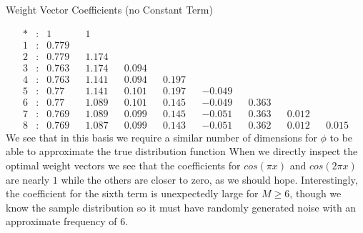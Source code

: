 \documentclass[1pt]{article}
\begin{document}
\begin{enumerate}[label=\alph*.)]
\centerline{Weight Vector Coefficients (no Constant Term)}
\begin{align*}
* & : & 1 & & 1 & &  \\
1 & : & 0.779 & &   & & \\
2 & : & 0.779 & & 1.174 & &  \\
3 & : & 0.763 & & 1.174 & & 0.094 \\
4 & : & 0.763 & & 1.141 & & 0.094 & & 0.197 \\
5 & : & 0.77 & & 1.141 & & 0.101 & & 0.197 & & -0.049 \\
6 & : & 0.77 & & 1.089 & & 0.101 & & 0.145 & & -0.049 & & 0.363 \\
7 & : & 0.769 & & 1.089 & & 0.099 & & 0.145 & & -0.051 & & 0.363 & & 0.012 \\
8 & : & 0.769 & & 1.087 & & 0.099 & & 0.143 & & -0.051 & & 0.362 & & 0.012 & & 0.015
\end{align*}
We see that in this basis we require a similar number of dimensions for $\phi$ to be able to approximate the true distribution function When we directly inspect the optimal weight vectors we see that the coefficients for $ cos(\pi x)$ and  $ cos(2 \pi x)$ are nearly $1$ while the others are closer to zero, as we should hope. Interestingly, the coefficient for the sixth term is unexpectedly large for $M \geq 6$, though we know the sample distribution so it must have randomly generated noise with an approximate frequency of $6$. 




\end{enumerate}
\end{document}
